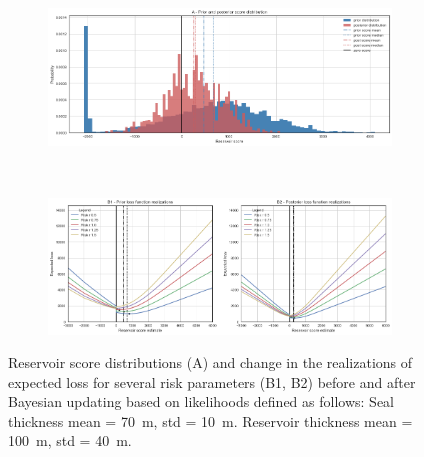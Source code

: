 	\begin{figure}[h]
		\begin{subfigure}{1\textwidth}
			\centering
			\includegraphics[width=1\linewidth]{Figures/update_smallres2.png}
		\end{subfigure}%
		\\
		\begin{subfigure}{1\textwidth}
			\centering
			\includegraphics[width=1\linewidth]{Figures/update_smallres3.png}
		\end{subfigure}
		\caption{Reservoir score distributions (A) and change in the realizations of expected loss for several risk parameters (B1, B2) before and after Bayesian updating based on likelihoods defined as follows: Seal thickness mean = 70~m, std = 10~m. Reservoir thickness mean = 100~m, std = 40~m.}
		\label{fig:update_smallres2_3}
	\end{figure}
			
	
